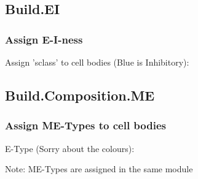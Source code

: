 \documentclass{beamer}
\begin{document}
\subsection{Build.EI}
\begin{frame}
  \frametitle{Assign E-I-ness}
  Assign 'sclass' to cell bodies (Blue is Inhibitory):

\end{frame}

\subsection{Build.Composition.ME}
\begin{frame}
  \frametitle{Assign ME-Types to cell bodies}
  E-Type (Sorry about the colours):


  Note: ME-Types are assigned in the same module
\end{frame}
\end{document}
